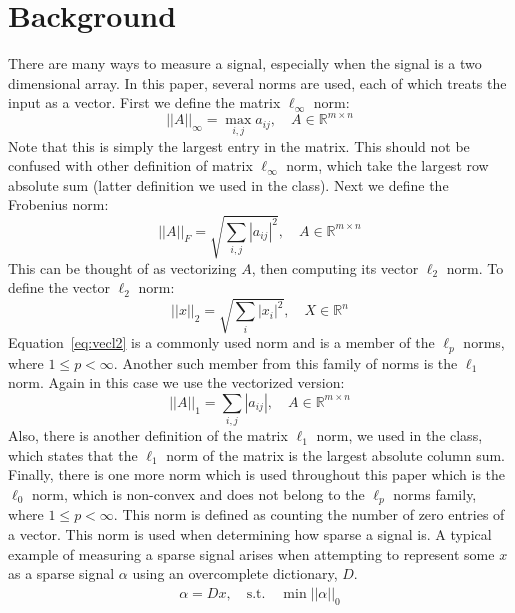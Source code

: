 \documentclass[journal]{IEEEtran}
\begin{document}
\section{Background}
There are many ways to measure a signal, especially when the signal is a two dimensional array. In this
paper, several norms are used, each of which treats the input as a vector. First we define the matrix $\ell_\infty$ norm:
\begin{equation}
||A||_\infty = \max_{i,j} a_{ij}, \quad A \in \mathbb{R}^{m\times n}
\label{eq:linfty}
\end{equation}
Note that this is simply the largest entry in the matrix. This should not be confused with other definition of matrix $\ell_\infty$ norm, which take the largest row absolute sum (latter definition we used in the class). Next we define the Frobenius norm:
\begin{equation}
||A||_F = \sqrt{\sum_{i,j} |a_{ij}|^2}, \quad A \in \mathbb{R}^{m\times n}
\label{eq:frob}
\end{equation}
This can be thought of as vectorizing $A$, then computing its vector $\ell_2$ norm.  To define the vector 
$\ell_2$ norm:
\begin{equation}
||x||_2 = \sqrt{\sum_{i} |x_{i}|^2}, \quad X \in \mathbb{R}^{n}
\label{eq:vecl2}
\end{equation}
Equation~\ref{eq:vecl2} is a commonly used norm and is a member of the $\ell_p$ norms,  where $1\leq p < \infty$. Another such member from
this family of norms is the $\ell_1$ norm. Again in this case we use the vectorized version:
\begin{equation}
||A||_1 = \sum_{i,j} |a_{ij}|, \quad A \in \mathbb{R}^{m\times n}
\label{eq:l1}
\end{equation}
Also, there is another definition of the matrix $\ell_1$ norm, we used in the class, which states that the $\ell_1$ norm of the matrix is the largest absolute column sum.\\ 
Finally, there is one more norm which is used throughout this paper which is the $\ell_0$ norm, which is non-convex and does not belong to the  $\ell_p$ norms family, where $1\leq p < \infty$.  This 
norm is defined as counting the number of zero entries of a vector. This norm is used when determining
how sparse a signal is. 
A typical example of measuring a sparse signal arises when attempting to represent some $x$ 
as a sparse signal $\alpha$ using an overcomplete dictionary, $D$.
\begin{align}
\alpha = Dx, \quad \mathrm{s.t.} \quad \min ||\alpha||_0
\label{eq:sparseproblem}
\end{align}
\end{document}
